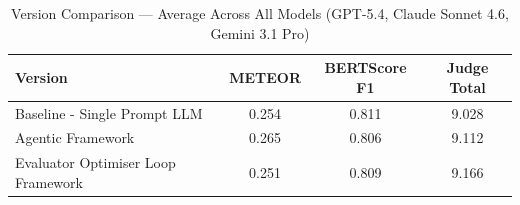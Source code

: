 \begin{table}[htbp]
\centering
\caption{Version Comparison — Average Across All Models (GPT-5.4, Claude Sonnet 4.6, Gemini 3.1 Pro)}
\label{tab:table_version_summary}
\begin{tabular}{lccc}
\toprule
Version & METEOR & BERTScore F1 & Judge Total \\
\midrule
Baseline - Single Prompt LLM & 0.254 & 0.811 & 9.028 \\
Agentic Framework & 0.265 & 0.806 & 9.112 \\
Evaluator Optimiser Loop Framework & 0.251 & 0.809 & 9.166 \\
\bottomrule
\end{tabular}
\end{table}